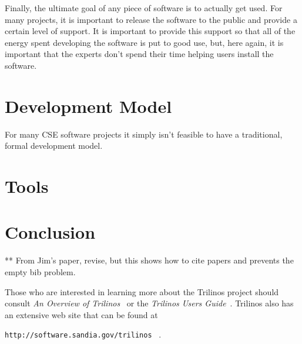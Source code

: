 \documentclass[12pt,relax]{article}
\newcommand{\InlineDirectory}[1]{
  {\hspace{0.01 in}} {\tt #1} {\hspace{0.01 in}}}
\begin{document}
Finally, the ultimate goal of any piece of software is to actually get used.  
For many projects, it is important to release the software to the public and 
provide a certain level of support.  It is important to provide this support 
so that all of the energy spent developing the software is put to good use, 
but, here again, it is important that the experts don't spend their time 
helping users install the software.

\clearpage


\section{Development Model}
\label{Section:Development Model}

For many CSE software projects it simply isn't feasible to have a traditional, 
formal development model.

\clearpage


\section{Tools}
\label{Section:Tools}

\clearpage


\section{Conclusion}
\label{Section:Conclusion}

\clearpage


** From Jim's paper, revise, but this shows how to cite papers and prevents the
empty bib problem.

Those who are interested in learning more about the Trilinos project should 
consult {\it An Overview of Trilinos}~\cite{Trilinos-Overview} or the
{\it Trilinos Users Guide}~\cite{Trilinos-Users-Guide}.  Trilinos also has an 
extensive web site that can be found at \newline
\InlineDirectory{http://software.sandia.gov/trilinos}~\cite{Trilinos-home-page}.

\clearpage



%

\end{document}
